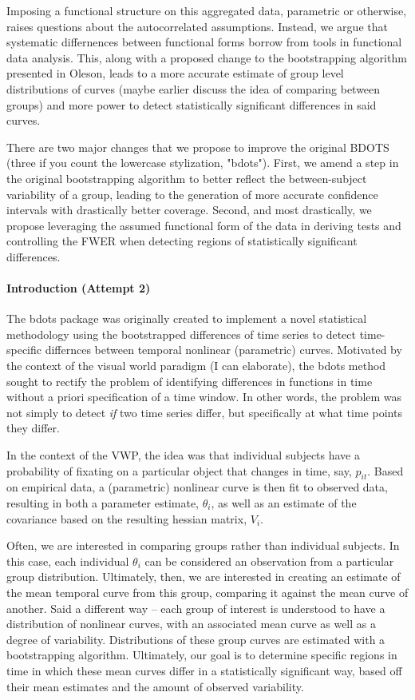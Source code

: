 \documentclass{article}
\begin{document}
Imposing a functional structure on this aggregated data, parametric or otherwise, raises questions about the autocorrelated assumptions. Instead, we argue that systematic differnences between functional forms borrow from tools in functional data analysis. This, along with a proposed change to the bootstrapping algorithm presented in Oleson, leads to a more accurate estimate of group level distributions of curves (maybe earlier discuss the idea of comparing between groups) and more power to detect statistically significant differences in said curves.

There are two major changes that we propose to improve the original BDOTS (three if you count the lowercase stylization, "bdots"). First, we amend a step in the original bootstrapping algorithm to better reflect the between-subject variability of a group, leading to the generation of more accurate confidence intervals with drastically better coverage. Second, and most drastically, we propose leveraging the assumed functional form of the data in deriving tests and controlling the FWER when detecting regions of statistically significant differences.

\paragraph{Introduction (Attempt 2)} The bdots package was originally created to implement a novel statistical methodology using the bootstrapped differences of time series to detect time-specific differnces between temporal nonlinear (parametric) curves. Motivated by the context of the visual world paradigm (I can elaborate), the bdots method sought to rectify the problem of identifying differences in functions in time without a priori specification of a time window. In other words, the problem was not simply to detect \textit{if} two time series differ, but specifically at what time points they differ. 

In the context of the VWP, the idea was that individual subjects have a probability of fixating on a particular object that changes in time, say, $p_{it}$. Based on empirical data, a (parametric) nonlinear curve is then fit to observed data, resulting in both a parameter estimate, $\theta_i$, as well as an estimate of the covariance based on the resulting hessian matrix, $V_i$.

Often, we are interested in comparing groups rather than individual subjects. In this case, each individual $\theta_i$ can be considered an observation from a particular group distribution. Ultimately, then, we are interested in creating an estimate of the mean temporal curve from this group, comparing it against the mean curve of another. Said a different way -- each group of interest is understood to have a distribution of nonlinear curves, with an associated mean curve as well as a degree of variability. Distributions of these group curves are estimated with a bootstrapping algorithm. Ultimately, our goal is to determine specific regions in time in which these mean curves differ in a statistically significant way, based off their mean estimates and the amount of observed variability.
\end{document}

